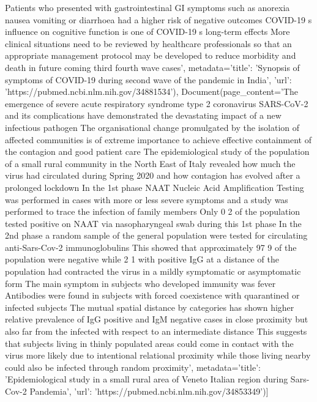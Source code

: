 Patients who presented with gastrointestinal GI symptoms such as anorexia nausea vomiting or diarrhoea had a higher risk of negative outcomes COVID-19 s influence on cognitive function is one of COVID-19 s long-term effects More clinical situations need to be reviewed by healthcare professionals so that an appropriate management protocol may be developed to reduce morbidity and death in future coming third fourth wave cases', metadata={'title': 'Synopsis of symptoms of COVID-19 during second wave of the pandemic in India', 'url': 'https://pubmed.ncbi.nlm.nih.gov/34881534'}), Document(page\_content='The emergence of severe acute respiratory syndrome type 2 coronavirus SARS-CoV-2 and its complications have demonstrated the devastating impact of a new infectious pathogen The organisational change promulgated by the isolation of affected communities is of extreme importance to achieve effective containment of the contagion and good patient care The epidemiological study of the population of a small rural community in the North East of Italy revealed how much the virus had circulated during Spring 2020 and how contagion has evolved after a prolonged lockdown In the 1st phase NAAT Nucleic Acid Amplification Testing was performed in cases with more or less severe symptoms and a study was performed to trace the infection of family members Only 0 2 of the population tested positive on NAAT via nasopharyngeal swab during this 1st phase In the 2nd phase a random sample of the general population were tested for circulating anti-Sars-Cov-2 immunoglobulins This showed that approximately 97 9 of the population were negative while 2 1 with positive IgG at a distance of the population had contracted the virus in a mildly symptomatic or asymptomatic form The main symptom in subjects who developed immunity was fever Antibodies were found in subjects with forced coexistence with quarantined or infected subjects The mutual spatial distance by categories has shown higher relative prevalence of IgG positive and IgM negative cases in close proximity but also far from the infected with respect to an intermediate distance This suggests that subjects living in thinly populated areas could come in contact with the virus more likely due to intentional relational proximity while those living nearby could also be infected through random proximity', metadata={'title': 'Epidemiological study in a small rural area of Veneto Italian region during Sars-Cov-2 Pandemia', 'url': 'https://pubmed.ncbi.nlm.nih.gov/34853349'})]


